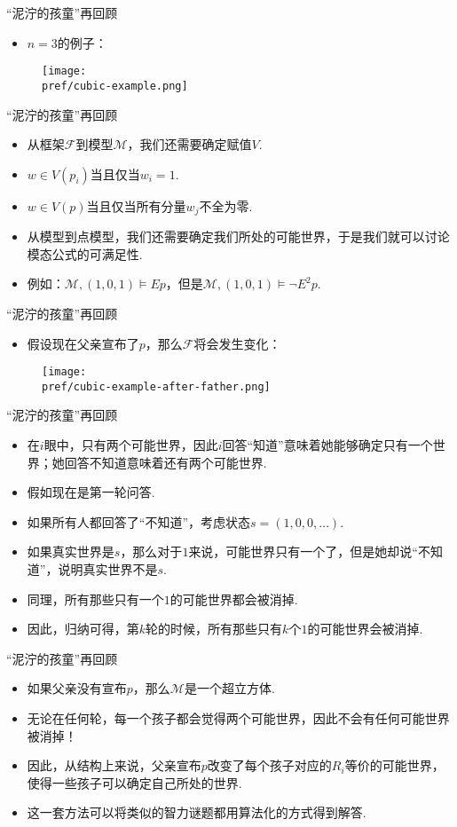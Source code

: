 {“泥泞的孩童”再回顾}
\begin{itemize}
    \item $n=3$的例子：
\end{itemize}
\begin{figure}[ht]
    \centering
    \texttt{[image: \\pref/cubic-example.png]}
\end{figure}


{“泥泞的孩童”再回顾}
\begin{itemize}
    \item 从框架$\mathcal F$到模型$\mathcal M$，我们还需要确定赋值$V$.
    \item $w\in V(p_i)$当且仅当$w_i=1$.
    \item $w\in V(p)$当且仅当所有分量$w_j$不全为零.
    \item 从模型到点模型，我们还需要确定我们所处的可能世界，于是我们就可以讨论模态公式的可满足性.
    \item 例如：$\mathcal M,(1,0,1)\vDash Ep$，但是$\mathcal M,(1,0,1)\vDash \neg E^2p$.
\end{itemize}


{“泥泞的孩童”再回顾}
\begin{itemize}
    \item 假设现在父亲宣布了$p$，那么$\mathcal F$将会发生变化：
\end{itemize}
\begin{figure}[ht]
    \centering
    \texttt{[image: \\pref/cubic-example-after-father.png]}
\end{figure}


{“泥泞的孩童”再回顾}
\begin{itemize}
    \item 在$i$眼中，只有两个可能世界，因此$i$回答“知道”意味着她能够确定只有一个世界；她回答不知道意味着还有两个可能世界.
    \item 假如现在是第一轮问答.
    \item 如果所有人都回答了“不知道”，考虑状态$s=(1,0,0,\dots)$.
    \item 如果真实世界是$s$，那么对于$1$来说，可能世界只有一个了，但是她却说“不知道”，说明真实世界不是$s$.
    \item 同理，所有那些只有一个$1$的可能世界都会被消掉.
    \item 因此，归纳可得，第$k$轮的时候，所有那些只有$k$个$1$的可能世界会被消掉. %
\end{itemize}


{“泥泞的孩童”再回顾}
\begin{itemize}
    \item 如果父亲没有宣布$p$，那么$\mathcal M$是一个超立方体.
    \item 无论在任何轮，每一个孩子都会觉得两个可能世界，因此不会有任何可能世界被消掉！
    \item 因此，从结构上来说，父亲宣布$p$改变了每个孩子对应的$R_i$等价的可能世界，使得一些孩子可以确定自己所处的世界.
    \item 这一套方法可以将类似的智力谜题都用算法化的方式得到解答.
\end{itemize}


